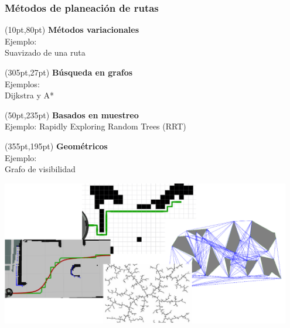 \documentclass[10pt,spanish,aspectratio=1610]{beamer}
\begin{document}
\begin{frame}\frametitle{Métodos de planeación de rutas}
  \begin{textblock*}{0.4\textwidth}(10pt,80pt)
    \textbf{ Métodos variacionales }\\Ejemplo:\\ Suavizado de una ruta
  \end{textblock*}
  \begin{textblock*}{0.35\textwidth}(305pt,27pt)
    \textbf{Búsqueda en grafos }\\Ejemplos: \\Dijkstra y A*
  \end{textblock*}
  \begin{textblock*}{0.3\textwidth}(50pt,235pt)
    \textbf{Basados en muestreo }\\Ejemplo: Rapidly Exploring Random Trees (RRT)
  \end{textblock*}
  \begin{textblock*}{0.25\textwidth}(355pt,195pt)
    \textbf{Geométricos }\\Ejemplo: \\ Grafo de visibilidad
  \end{textblock*}
  \centering
  \includegraphics[width=0.95\textwidth]{Figures/PathPlanningMethods.pdf}
\end{frame}
\end{document}
